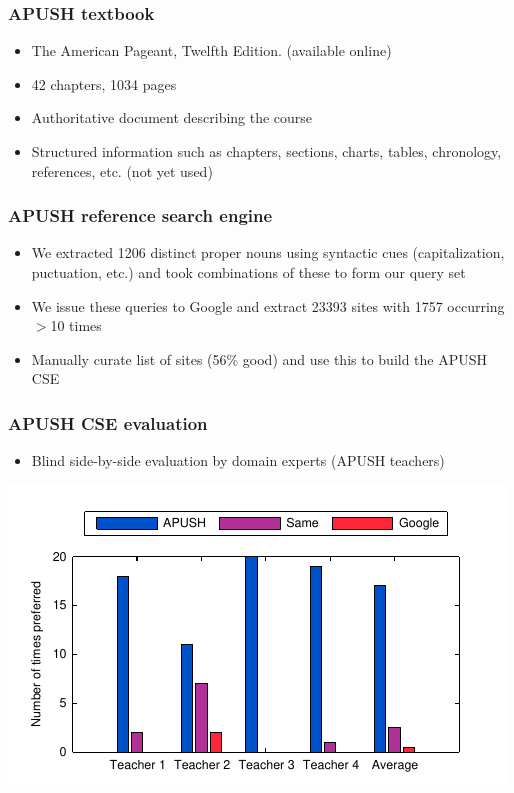 \documentclass{beamer}
\begin{document}
\begin{frame}
\frametitle{APUSH textbook}
\begin{itemize}
\item The American Pageant, Twelfth Edition. (available online)
\item 42 chapters, 1034 pages
\item Authoritative document describing the course
\item Structured information such as chapters, sections, charts, tables, chronology,
  references, etc. (not yet used)
\end{itemize}
\end{frame}

\begin{frame}
\frametitle{APUSH reference search engine}
\begin{itemize}
\item We extracted 1206 distinct proper nouns using syntactic cues (capitalization,
  puctuation, etc.) and took combinations of these to form our query set
\item We issue these queries to Google and extract 23393 sites with 1757
  occurring $>$10 times  
\item Manually curate list of sites (56\% good) and use this to build the APUSH
  CSE 
\end{itemize}
\end{frame}

\begin{frame}
\frametitle{APUSH CSE evaluation}
\begin{itemize}
  \item Blind side-by-side evaluation by domain experts (APUSH teachers)
\end{itemize}
\begin{center}
\includegraphics{teacher_eval}
\end{center}
\end{frame}
\end{document}
